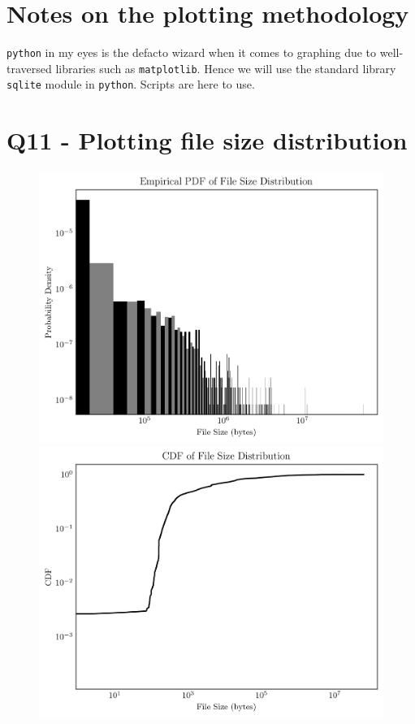 \documentclass{article}
\begin{document}
\section*{Notes on the plotting methodology}
\texttt{python} in my eyes is the defacto wizard when it comes to graphing due to well-traversed libraries such as \texttt{matplotlib}. Hence we will use the standard library \texttt{sqlite} module in \texttt{python}. Scripts are here to use.

\section*{Q11 - Plotting file size distribution}

\begin{figure}[htbp]
\centering

\begin{minipage}{.5\linewidth}
\centering
{}
\includegraphics[width=\linewidth]{./images/file_size_pdf.png}
\end{minipage}%
\begin{minipage}{.5\linewidth}
\centering
{}
\includegraphics[width=\linewidth]{./images/file_size_cdf.png}
\end{minipage}


\end{figure}
\end{document}
